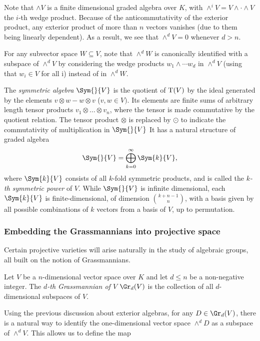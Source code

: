 Note that $\wedge V$ is a finite dimensional graded algebra over $K$, with $\wedge^i V = V \wedge \cdot \wedge V$ the $i$-th wedge product. Because of the anticommutativity of the exterior product, any exterior product of more than $n$ vectors vanishes (due to them being linearly dependent). As a result, we see that $\wedge^d V = 0$ whenever $d > n$.

For any subvector space $W \subseteq V$, note that $\wedge^d W$ is canonically identified with a subspace of $\wedge^d V$ by considering the wedge products $w_1 \wedge \cdots w_d$ in $\wedge^d V$ (using that $w_i \in V$ for all i) instead of in $\wedge^d W$.

The \emph{symmetric algebra} $\Sym{}{V}$ is the quotient of $\textnormal{T}(V)$ by the ideal generated by the elements $v \otimes w - w \otimes v$ ($v,w \in V)$. Its elements are finite sums of arbitrary length tensor products $v_1 \otimes \ldots \otimes v_n$, where the tensor is made commutative by the quotient relation. The tensor product $\otimes$ is replaced by $\odot$ to indicate the commutativity of multiplication in $\Sym{}{V}$
It has a natural structure of graded algebra
\[ \Sym{}{V} = \bigoplus_{k = 0}^{\infty} \Sym{k}{V}, \]
where $\Sym{k}{V}$ consists of all $k$-fold symmetric products, and is called the \emph{$k$-th symmetric power} of $V$. While $\Sym{}{V}$ is infinite dimensional, each $\Sym{k}{V}$ is finite-dimensional, of dimension $\binom{k + n - 1}{n}$, with a basis given by all possible combinations of $k$ vectors from a basis of $V$, up to permutation.

\subsubsection{Embedding the Grassmannians into projective space}

Certain projective varieties will arise naturally in the study of algebraic groups, all built on the notion of Grassmannians.

\begin{defn}
    Let $V$ be a $n$-dimensional vector space over $K$ and let $d \leq n$ be a non-negative integer. The \emph{$d$-th Grassmannian of $V$} $\Gr_d(V)$ is the collection of all $d$-dimensional subspaces of $V$.
\end{defn}

Using the previous discussion about exterior algebras, for any $D \in \Gr_d(V)$, there is a natural way to identify the one-dimensional vector space $\wedge^d D$ as a subspace of $\wedge^d V$. This allows us to define the map

